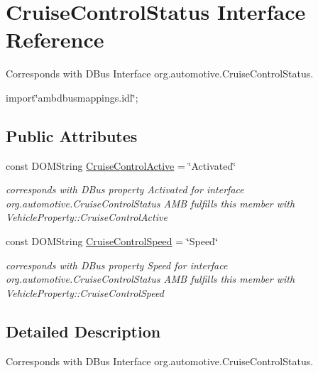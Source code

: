\hypertarget{interfaceCruiseControlStatus}{\section{Cruise\+Control\+Status Interface Reference}
\label{interfaceCruiseControlStatus}
}


Corresponds with D\+Bus Interface org.\+automotive.\+Cruise\+Control\+Status.  




{\ttfamily import\char`\"{}ambdbusmappings.\+idl\char`\"{};}

\subsection*{Public Attributes}
\begin{DoxyCompactItemize}
\item 
const D\+O\+M\+String \hyperlink{interfaceCruiseControlStatus_a53b67edfb476d0fb49919d6f831ef7ac}{Cruise\+Control\+Active} = \char`\"{}Activated\char`\"{}
\begin{DoxyCompactList}\small\item\em corresponds with D\+Bus property Activated for interface org.\+automotive.\+Cruise\+Control\+Status A\+M\+B fulfills this member with Vehicle\+Property\+::\+Cruise\+Control\+Active \end{DoxyCompactList}\item 
\hypertarget{interfaceCruiseControlStatus_ae4bfdcaa9eaf5e7dace7dcc23e9513ee}{const D\+O\+M\+String \hyperlink{interfaceCruiseControlStatus_ae4bfdcaa9eaf5e7dace7dcc23e9513ee}{Cruise\+Control\+Speed} = \char`\"{}Speed\char`\"{}}\label{interfaceCruiseControlStatus_ae4bfdcaa9eaf5e7dace7dcc23e9513ee}

\begin{DoxyCompactList}\small\item\em corresponds with D\+Bus property Speed for interface org.\+automotive.\+Cruise\+Control\+Status A\+M\+B fulfills this member with Vehicle\+Property\+::\+Cruise\+Control\+Speed \end{DoxyCompactList}\end{DoxyCompactItemize}


\subsection{Detailed Description}
Corresponds with D\+Bus Interface org.\+automotive.\+Cruise\+Control\+Status. 

